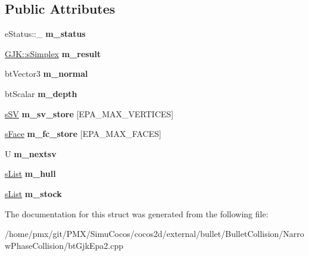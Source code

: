 \subsection*{Public Attributes}
\begin{DoxyCompactItemize}
\item 
\mbox{\label{structgjkepa2__impl_1_1EPA_ad364c49ac6b754b7aa56b4e7322739f7}} 
e\+Status\+::\+\_\+ {\bfseries m\+\_\+status}
\item 
\mbox{\label{structgjkepa2__impl_1_1EPA_a38aac942239d780dbf019a5bbd815bba}} 
\hyperlink{structgjkepa2__impl_1_1GJK_1_1sSimplex}{G\+J\+K\+::s\+Simplex} {\bfseries m\+\_\+result}
\item 
\mbox{\label{structgjkepa2__impl_1_1EPA_a3771e3e7e8e99cbca0e5ce27ef505bd1}} 
bt\+Vector3 {\bfseries m\+\_\+normal}
\item 
\mbox{\label{structgjkepa2__impl_1_1EPA_a7329b93546644d254bb01193b324f80a}} 
bt\+Scalar {\bfseries m\+\_\+depth}
\item 
\mbox{\label{structgjkepa2__impl_1_1EPA_a5c2c3d064d13f1270ed589c090b62d05}} 
\hyperlink{structgjkepa2__impl_1_1GJK_1_1sSV}{s\+SV} {\bfseries m\+\_\+sv\+\_\+store} \mbox{[}E\+P\+A\+\_\+\+M\+A\+X\+\_\+\+V\+E\+R\+T\+I\+C\+ES\mbox{]}
\item 
\mbox{\label{structgjkepa2__impl_1_1EPA_ab0293865869ece92d35106a0d4bf6dda}} 
\hyperlink{structgjkepa2__impl_1_1EPA_1_1sFace}{s\+Face} {\bfseries m\+\_\+fc\+\_\+store} \mbox{[}E\+P\+A\+\_\+\+M\+A\+X\+\_\+\+F\+A\+C\+ES\mbox{]}
\item 
\mbox{\label{structgjkepa2__impl_1_1EPA_ad140d2e9afab9280d11b1175d42994c9}} 
U {\bfseries m\+\_\+nextsv}
\item 
\mbox{\label{structgjkepa2__impl_1_1EPA_ab5f509efd64c357fc587136f30242d0e}} 
\hyperlink{structgjkepa2__impl_1_1EPA_1_1sList}{s\+List} {\bfseries m\+\_\+hull}
\item 
\mbox{\label{structgjkepa2__impl_1_1EPA_abf546eab1bcce4dce9df72d4d404dce6}} 
\hyperlink{structgjkepa2__impl_1_1EPA_1_1sList}{s\+List} {\bfseries m\+\_\+stock}
\end{DoxyCompactItemize}


The documentation for this struct was generated from the following file\+:\begin{DoxyCompactItemize}
\item 
/home/pmx/git/\+P\+M\+X/\+Simu\+Cocos/cocos2d/external/bullet/\+Bullet\+Collision/\+Narrow\+Phase\+Collision/bt\+Gjk\+Epa2.\+cpp\end{DoxyCompactItemize}
